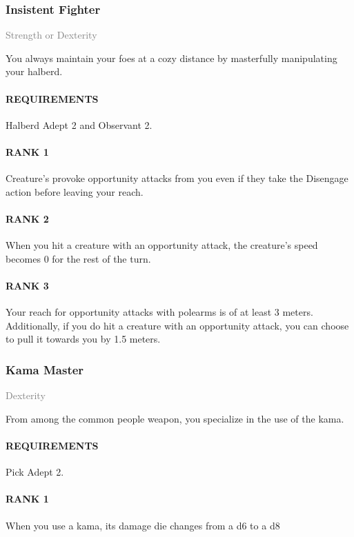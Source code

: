 \subsubsection{Insistent Fighter} \label{feat::insistentfighter}
\small{\textcolor{gray}{Strength or Dexterity}}

\normalsize
You always maintain your foes at a cozy distance by masterfully manipulating your halberd.
\paragraph{REQUIREMENTS} Halberd Adept 2 and Observant 2.
\paragraph{RANK 1} Creature's provoke opportunity attacks from you even if they take the Disengage action before leaving your reach.
\paragraph{RANK 2} When you hit a creature with an opportunity attack, the creature's speed becomes 0 for the rest of the turn.
\paragraph{RANK 3} Your reach for opportunity attacks with polearms is of at least 3 meters.
Additionally, if you do hit a creature with an opportunity attack, you can choose to pull it towards you by 1.5 meters.

\subsubsection{Kama Master} \label{feat::kamamaster}
\small{\textcolor{gray}{Dexterity}}

\normalsize
From among the common people weapon, you specialize in the use of the kama.
\paragraph{REQUIREMENTS} Pick Adept 2.
\paragraph{RANK 1} When you use a kama, its damage die changes from a d6 to a d8
